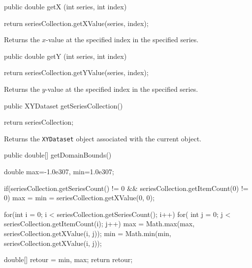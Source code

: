 \begin{code}

   public double getX (int series, int index) \begin{hide} {
      return seriesCollection.getXValue(series, index);
   }\end{hide}
\end{code}
\begin{tabb}
   Returns the $x$-value at the specified index in the specified series.
\end{tabb}
\begin{htmlonly}
\end{htmlonly}
\begin{code}

   public double getY (int series, int index) \begin{hide} {
      return seriesCollection.getYValue(series, index);
   }\end{hide}
\end{code}
\begin{tabb}
   Returns the $y$-value at the specified index in the specified series.
\end{tabb}
\begin{htmlonly}
\end{htmlonly}
\begin{code}

   public XYDataset getSeriesCollection() \begin{hide} {
      return seriesCollection;
   }\end{hide}
\end{code}
\begin{tabb}
   Returns the \texttt{XYDataset} object associated with the current object.
\end{tabb}
\begin{htmlonly}
\end{htmlonly}
\begin{code}

   public double[] getDomainBounds() \begin{hide} {
      double max=-1.0e307, min=1.0e307;

      if(seriesCollection.getSeriesCount() != 0 && seriesCollection.getItemCount(0) != 0)
         max = min = seriesCollection.getXValue(0, 0);

      for(int i = 0; i < seriesCollection.getSeriesCount(); i++) {
         for( int j = 0; j < seriesCollection.getItemCount(i); j++) {
            max = Math.max(max, seriesCollection.getXValue(i, j));
            min = Math.min(min, seriesCollection.getXValue(i, j));
         }
      }

      double[] retour = {min, max};
      return retour;
   }\end{hide}
\end{code}
